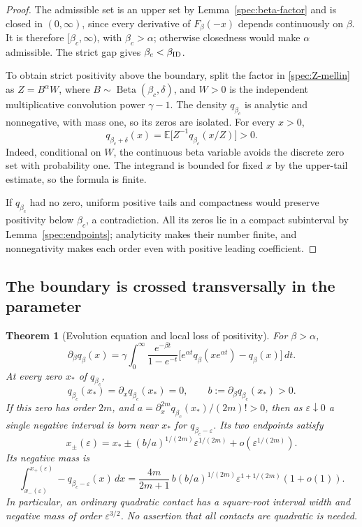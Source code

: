 \documentclass[11pt,a4paper]{article}
\newtheorem{theorem}{Theorem}[section]
\theoremstyle{definition}
\theoremstyle{remark}
\numberwithin{equation}{section}
\begin{document}
\begin{proof}
The admissible set is an upper set by Lemma~\ref{spec:beta-factor} and
is closed in \((0,\infty)\), since every derivative of \(F_\beta(-x)\)
depends continuously on \(\beta\).  It is therefore
\([\beta_c,\infty)\), with \(\beta_c>\alpha\); otherwise closedness
would make \(\alpha\) admissible.  The strict gap gives
\(\beta_c<\beta_{\rm ID}\).

To obtain strict positivity above the boundary, split the factor in
\eqref{spec:Z-mellin} as \(Z=B^\alpha W\), where
\(B\sim\operatorname{Beta}(\beta_c,\delta)\), and \(W>0\) is the
independent multiplicative convolution power \(\gamma-1\).
The density \(q_{\beta_c}\) is analytic and nonnegative, with mass
one, so its zeros are isolated.  For every \(x>0\),
\[
 q_{\beta_c+\delta}(x)
   =\mathbb E\bigl[Z^{-1}q_{\beta_c}(x/Z)\bigr]>0.
\]
Indeed, conditional on \(W\), the continuous beta variable avoids
the discrete zero set with probability one.  The integrand is bounded
for fixed \(x\) by the upper-tail estimate, so the formula is finite.

If \(q_{\beta_c}\) had no zero, uniform positive tails and compactness
would preserve positivity below \(\beta_c\), a contradiction.  All its
zeros lie in a compact subinterval by Lemma~\ref{spec:endpoints};
analyticity makes their number finite, and nonnegativity makes each
order even with positive leading coefficient.
\end{proof}

\subsection{The boundary is crossed transversally in the parameter}

\begin{theorem}[Evolution equation and local loss of positivity]
\label{spec:contact}
For \(\beta>\alpha\),
\begin{equation}\label{spec:generator}
 \partial_\beta q_\beta(x)
 =\gamma\int_0^\infty\frac{e^{-\beta t}}{1-e^{-t}}
       \bigl[e^{\alpha t}q_\beta(xe^{\alpha t})-q_\beta(x)\bigr]\,dt.
\end{equation}
At every zero \(x_*\) of \(q_{\beta_c}\),
\[
 q_{\beta_c}(x_*)=\partial_xq_{\beta_c}(x_*)=0,
 \qquad b:=\partial_\beta q_{\beta_c}(x_*)>0.
\]
If this zero has order \(2m\), and
\(a=\partial_x^{2m}q_{\beta_c}(x_*)/(2m)!>0\), then as
\(\varepsilon\downarrow0\) a single negative interval is born near
\(x_*\) for \(q_{\beta_c-\varepsilon}\).  Its two endpoints satisfy
\begin{equation}\label{spec:splitting}
 x_\pm(\varepsilon)
  =x_*\pm(b/a)^{1/(2m)}\varepsilon^{1/(2m)}
       +o(\varepsilon^{1/(2m)}).
\end{equation}
Its negative mass is
\begin{equation}\label{spec:negative-mass}
 \int_{x_-(\varepsilon)}^{x_+(\varepsilon)}
       -q_{\beta_c-\varepsilon}(x)\,dx
 =\frac{4m}{2m+1}\,b(b/a)^{1/(2m)}
       \varepsilon^{1+1/(2m)}(1+o(1)).
\end{equation}
In particular, an ordinary quadratic contact has a square-root
interval width and negative mass of order \(\varepsilon^{3/2}\).
No assertion that all contacts are quadratic is needed.
\end{theorem}
\end{document}
